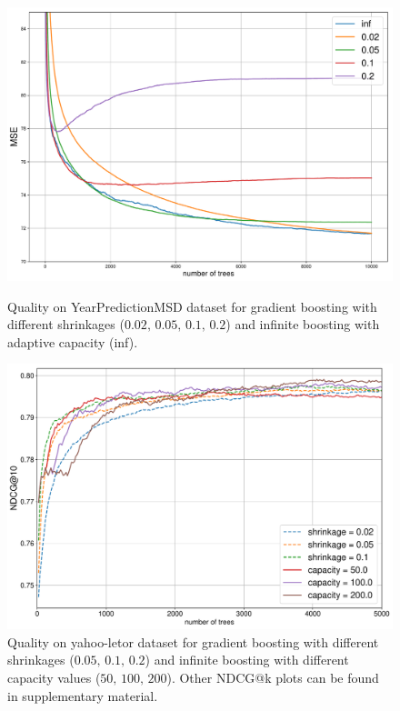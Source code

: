 \begin{figure}[!h]
  \centering
  \begin{multicols}{2}
    \includegraphics[width=1\linewidth]{../research/plots/songs_mse.pdf}
    \caption{Quality on YearPredictionMSD dataset for gradient boosting with different shrinkages ($0.02,\, 0.05, \, 0.1,\, 0.2$) and infinite boosting with adaptive capacity (inf). \label{fig:gb-mse}}
    \includegraphics[width=1\linewidth]{../research/plots/ndcg_at_10.pdf}
    \caption{Quality on yahoo-letor dataset for gradient boosting with different shrinkages ($0.05, \, 0.1,\, 0.2$) and infinite boosting with different capacity values ($50,\, 100,\, 200$).
             Other NDCG@k plots can be found in supplementary material. \label{fig:gb-ndcg}}
  \end{multicols}
\end{figure}
